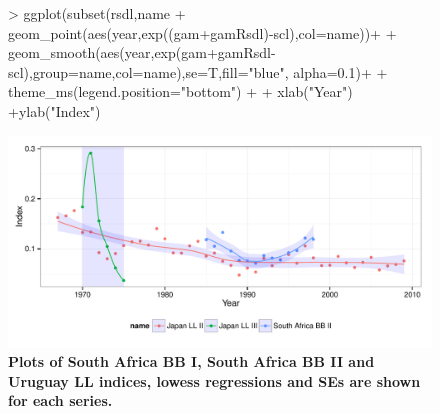 \documentclass[shortnames,nojss,article]{jss}
\begin{document}
\begin{figure}\begin{center}
\begin{Schunk}
\begin{Sinput}
> ggplot(subset(rsdl,name %
+              geom_point(aes(year,exp((gam+gamRsdl)-scl),col=name))+
+              geom_smooth(aes(year,exp(gam+gamRsdl-scl),group=name,col=name),se=T,fill="blue", alpha=0.1)+
+              theme_ms(legend.position="bottom") +
+              xlab("Year") +ylab("Index")
\end{Sinput}
\end{Schunk}
\includegraphics{diags-011}
\caption{\bf{Plots of Japan LL II, Japan LL III and South Africa BB II indices, lowess regressions and SEs are shown for each series.}}\caption{\bf{Plots of South Africa BB I, South Africa BB II and Uruguay LL indices, lowess regressions and SEs are shown for each series.}}
\label{cpue:4}
\end{center}
\end{figure}
\end{document}
